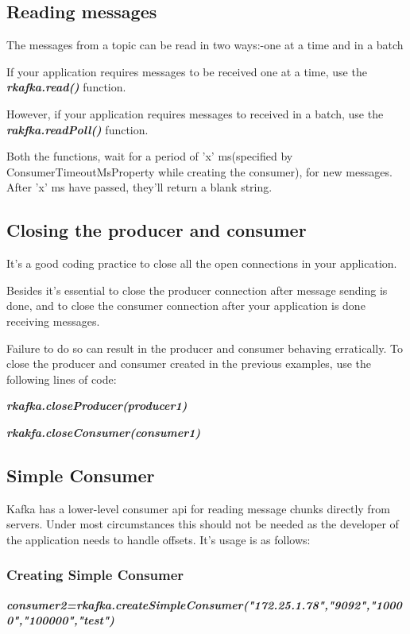 \documentclass[english,pdftex,a4paper]{article}
\begin{document}
\subsection{\textbf{Reading messages}}
\par{The messages from a topic can be read in two ways:-one at a time and in a batch}
\par{If your application requires messages to be received one at a time, use the \textit{\textbf{rkafka.read()}} function.}
\par{However, if your application requires messages to received in a batch, use the \textit{\textbf{rakfka.readPoll() }}function.}
\par{Both the functions, wait for a period of 'x' ms(specified by ConsumerTimeoutMsProperty while creating the consumer), for new messages. After 'x' ms have passed, they'll return a blank string.}
\subsection{\textbf{Closing the producer and consumer}}
\par{It's a good coding practice to close all the open connections in your application.}
\par{Besides it's essential to close the producer connection after message sending is done, and to close the consumer connection after your application is done receiving messages.}
\par{Failure to do so can result in the producer and consumer behaving erratically. To close the producer and consumer created in the previous examples, use the following lines of code:}
\par{\textit{\textbf{rkafka.closeProducer(producer1)}}}
\par{\textit{\textbf{rkakfa.closeConsumer(consumer1)}}}
\subsection{\textbf{Simple Consumer}}
\par{Kafka has a lower-level consumer api for reading message chunks directly from servers.  Under most circumstances this should not be needed as the developer of the application needs to handle offsets. It's usage is as follows:}
\subsubsection{\textbf{Creating Simple Consumer}}
\par{\textit{\textbf{consumer2=rkafka.createSimpleConsumer("172.25.1.78","9092","10000","100000","test")}}}
\end{document}
